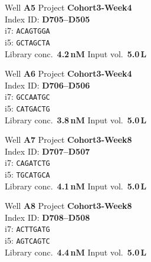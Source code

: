 \begin{minipage}[t]{0.47\linewidth}
\begin{samplecard}[VX-2205]
\footnotesize
Well \textbf{A5} \hfill Project \textbf{Cohort3-Week4}\\[3pt]
Index ID: \textbf{D705--D505}\\[2pt]
i7: \bA\bC\bA\bG\bT\bG\bG\bA \texttt{ACAGTGGA}\\[3pt]
i5: \bG\bC\bT\bA\bG\bC\bT\bA \texttt{GCTAGCTA}\\[3pt]
Library conc.\ \textbf{4.2\,nM} \hfill Input vol.\ \textbf{5.0\,\textmu L}
\end{samplecard}
\end{minipage}\hfill
\begin{minipage}[t]{0.47\linewidth}
\begin{samplecard}[VX-2206]
\footnotesize
Well \textbf{A6} \hfill Project \textbf{Cohort3-Week4}\\[3pt]
Index ID: \textbf{D706--D506}\\[2pt]
i7: \bG\bC\bC\bA\bA\bT\bG\bC \texttt{GCCAATGC}\\[3pt]
i5: \bC\bA\bT\bG\bA\bC\bT\bG \texttt{CATGACTG}\\[3pt]
Library conc.\ \textbf{3.8\,nM} \hfill Input vol.\ \textbf{5.0\,\textmu L}
\end{samplecard}
\end{minipage}
\par\vspace{6pt}

\begin{minipage}[t]{0.47\linewidth}
\begin{samplecard}[VX-2207]
\footnotesize
Well \textbf{A7} \hfill Project \textbf{Cohort3-Week8}\\[3pt]
Index ID: \textbf{D707--D507}\\[2pt]
i7: \bC\bA\bG\bA\bT\bC\bT\bG \texttt{CAGATCTG}\\[3pt]
i5: \bT\bG\bC\bA\bT\bG\bC\bA \texttt{TGCATGCA}\\[3pt]
Library conc.\ \textbf{4.1\,nM} \hfill Input vol.\ \textbf{5.0\,\textmu L}
\end{samplecard}
\end{minipage}\hfill
\begin{minipage}[t]{0.47\linewidth}
\begin{samplecard}[VX-2208]
\footnotesize
Well \textbf{A8} \hfill Project \textbf{Cohort3-Week8}\\[3pt]
Index ID: \textbf{D708--D508}\\[2pt]
i7: \bA\bC\bT\bT\bG\bA\bT\bG \texttt{ACTTGATG}\\[3pt]
i5: \bA\bG\bT\bC\bA\bG\bT\bC \texttt{AGTCAGTC}\\[3pt]
Library conc.\ \textbf{4.4\,nM} \hfill Input vol.\ \textbf{5.0\,\textmu L}
\end{samplecard}
\end{minipage}

